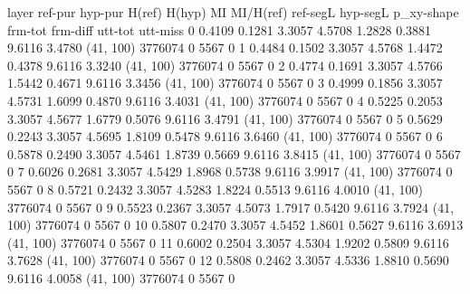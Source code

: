 layer     ref-pur    hyp-pur    H(ref)    H(hyp)      MI    MI/H(ref)    ref-segL    hyp-segL  p_xy-shape      frm-tot    frm-diff    utt-tot    utt-miss
0          0.4109     0.1281    3.3057    4.5708  1.2828       0.3881      9.6116      3.4780  (41, 100)       3776074           0       5567           0
1          0.4484     0.1502    3.3057    4.5768  1.4472       0.4378      9.6116      3.3240  (41, 100)       3776074           0       5567           0
2          0.4774     0.1691    3.3057    4.5766  1.5442       0.4671      9.6116      3.3456  (41, 100)       3776074           0       5567           0
3          0.4999     0.1856    3.3057    4.5731  1.6099       0.4870      9.6116      3.4031  (41, 100)       3776074           0       5567           0
4          0.5225     0.2053    3.3057    4.5677  1.6779       0.5076      9.6116      3.4791  (41, 100)       3776074           0       5567           0
5          0.5629     0.2243    3.3057    4.5695  1.8109       0.5478      9.6116      3.6460  (41, 100)       3776074           0       5567           0
6          0.5878     0.2490    3.3057    4.5461  1.8739       0.5669      9.6116      3.8415  (41, 100)       3776074           0       5567           0
7          0.6026     0.2681    3.3057    4.5429  1.8968       0.5738      9.6116      3.9917  (41, 100)       3776074           0       5567           0
8          0.5721     0.2432    3.3057    4.5283  1.8224       0.5513      9.6116      4.0010  (41, 100)       3776074           0       5567           0
9          0.5523     0.2367    3.3057    4.5073  1.7917       0.5420      9.6116      3.7924  (41, 100)       3776074           0       5567           0
10         0.5807     0.2470    3.3057    4.5452  1.8601       0.5627      9.6116      3.6913  (41, 100)       3776074           0       5567           0
11         0.6002     0.2504    3.3057    4.5304  1.9202       0.5809      9.6116      3.7628  (41, 100)       3776074           0       5567           0
12         0.5808     0.2462    3.3057    4.5336  1.8810       0.5690      9.6116      4.0058  (41, 100)       3776074           0       5567           0
   